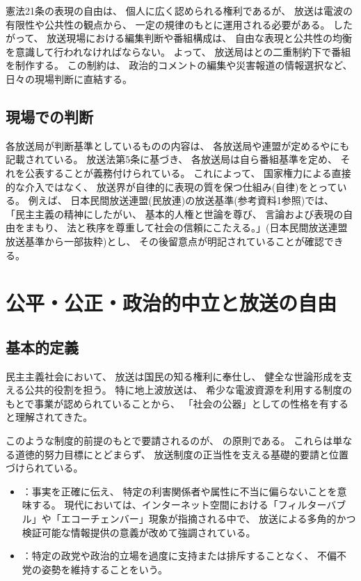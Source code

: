 憲法21条の表現の自由は、
個人に広く認められる権利であるが、
放送は電波の有限性や公共性の観点から、
一定の規律のもとに運用される必要がある。
したがって、
放送現場における編集判断や番組構成は、
自由な表現と公共性の均衡を意識して行われなければならない。
よって、
放送局はとの二重制約下で番組を制作する。
この制約は、
政治的コメントの編集や災害報道の情報選択など、
日々の現場判断に直結する。

\subsection{現場での判断}

各放送局が判断基準としているものの内容は、
各放送局や連盟が定めるやにも記載されている。
放送法第5条に基づき、
各放送局は自ら番組基準を定め、
それを公表することが義務付けられている。
これによって、
国家権力による直接的な介入ではなく、
放送界が自律的に表現の質を保つ仕組み(自律)をとっている。
例えば、
日本民間放送連盟(民放連)の放送基準{\small(参考資料1参照)}では、
「民主主義の精神にしたがい、
基本的人権と世論を尊び、
言論および表現の自由をまもり、
法と秩序を尊重して社会の信頼にこたえる。」{\small(日本民間放送連盟 放送基準から一部抜粋)}とし、
その後留意点が明記されていることが確認できる。

\section{公平・公正・政治的中立と放送の自由}

\subsection{基本的定義}
民主主義社会において、
放送は国民の知る権利に奉仕し、
健全な世論形成を支える公共的役割を担う。
特に地上波放送は、
希少な電波資源を利用する制度のもとで事業が認められていることから、
「社会の公器」としての性格を有すると理解されてきた。

このような制度的前提のもとで要請されるのが、
の原則である。
これらは単なる道徳的努力目標にとどまらず、
放送制度の正当性を支える基礎的要請と位置づけられている。

\begin{itemize}
    \item {}：事実を正確に伝え、
    特定の利害関係者や属性に不当に偏らないことを意味する。
    現代においては、インターネット空間における「フィルターバブル」や「エコーチェンバー」現象が指摘される中で、
    放送による多角的かつ検証可能な情報提供の意義が改めて強調されている。
    \item {}：特定の政党や政治的立場を過度に支持または排斥することなく、
    不偏不党の姿勢を維持することをいう。
\end{itemize}

